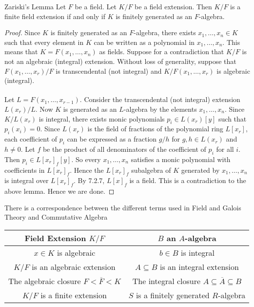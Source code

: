 \documentclass[a4paper]{article}
\begin{document}
\begin{thm}{Zariski's Lemma}{} Let $F$ be a field. Let $K/F$ be a field extension. Then $K/F$ is a finite field extension if and only if $K$ is finitely generated as an $F$-algebra. 
\begin{proof}
Since $K$ is finitely generated as an $F$-algebra, there exists $x_1,\dots,x_n\in K$ such that every element in $K$ can be written as a polynomial in $x_1,\dots,x_n$. This means that $K=F(x_1,\dots,x_n)$ as fields. Suppose for a contradiction that $K/F$ is not an algebraic (integral) extension. Without loss of generality, suppose that $F(x_1,\dots,x_r)/F$ is transcendental (not integral) and $K/F(x_1,\dots,x_r)$ is algebraic (integral). \\~\\

Let $L=F(x_1,\dots,x_{r-1})$. Consider the transcendental (not integral) extension $L(x_r)/L$. Now $K$ is generated as an $L$-algebra by the elements $x_1,\dots,x_n$. Since $K/L(x_r)$ is integral, there exists monic polynomials $p_i\in L(x_r)[y]$ such that $p_i(x_i)=0$. Since $L(x_r)$ is the field of fractions of the polynomial ring $L[x_r]$, each coefficient of $p_i$ can be expressed as a fraction $g/h$ for $g,h\in L(x_r)$ and $h\neq 0$. Let $f$ be the product of all denominators of the coefficient of $p_i$ for all $i$. Then $p_i\in L[x_r]_f[y]$. So every $x_1,\dots,x_n$ satisfies a monic polynomial with coefficients in $L[x_r]_f$. Hence the $L[x_r]_f$ subalgebra of $K$ generated by $x_1,\dots,x_n$ is integral over $L[x_r]_f$. By 7.2.7, $L[x]_f$ is a field. This is a contradiction to the above lemma. Hence we are done. 
\end{proof}
\end{thm}

There is a correspondence between the different terms used in Field and Galois Theory and Commutative Algebra

\begin{table}[!h]
\centering
\begin{tabular}{c|c}
Field Extension $K/F$  & $B$ an $A$-algebra \\ \hline
$x\in K$ is algebraic     & $b\in B$ is integral            \\
$K/F$ is an algebraic extension    & $A\subseteq B$ is an integral extension       \\
The algebraic closure $F<\overline{F}<K$     & The integral closure $A\subseteq\overline{A}\subseteq B$          \\
$K/F$ is a finite extension & $S$ is a finitely generated $R$-algebra
\end{tabular}
\end{table}
\end{document}
